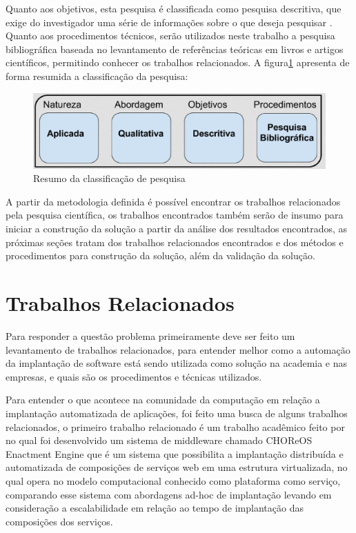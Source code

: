 Quanto aos objetivos, esta pesquisa é classificada como pesquisa descritiva, que
exige do investigador uma série de informações sobre o que deseja pesquisar
\cite{trivinos1987introduccao}. Quanto aos procedimentos técnicos, serão utilizados
neste trabalho a pesquisa bibliográfica baseada no levantamento de referências
teóricas em livros e artigos científicos, permitindo conhecer os trabalhos
relacionados. A figura\ref{fig:metodologia1} apresenta de forma resumida a
classificação da pesquisa:

\begin{figure}[h]
  \centering
  \includegraphics[width=1.0\textwidth]
      {figuras/met1.eps}
  \caption{Resumo da classificação de pesquisa}
\label{fig:metodologia1}
\end{figure}

A partir da metodologia definida é possível encontrar os trabalhos relacionados
pela pesquisa científica, os trabalhos encontrados também serão de insumo para iniciar
a construção da solução a partir da análise dos resultados encontrados,
as próximas seções tratam dos trabalhos relacionados encontrados e dos métodos e
procedimentos para construção da solução, além da validação da solução.

\section{Trabalhos Relacionados}
\label{section:trabalhos_relacionados}
Para responder a questão problema primeiramente deve ser feito um levantamento
de trabalhos relacionados, para entender melhor como a automação da implantação
de software está sendo utilizada como solução na academia e nas empresas, e
quais são os procedimentos e técnicas utilizados.

Para entender o que acontece na comunidade da computação em relação a implantação
automatizada de aplicações, foi feito uma busca de alguns trabalhos relacionados, o primeiro
trabalho relacionado é um trabalho acadêmico feito por\cite{leo2014} no qual foi
desenvolvido um sistema de middleware chamado CHOReOS Enactment Engine que é um
sistema que possibilita a implantação distribuída e automatizada de composições
de serviços web em uma estrutura virtualizada, no qual opera no modelo
computacional conhecido como plataforma como serviço, comparando esse sistema
com abordagens ad-hoc de implantação levando em consideração a escalabilidade
em relação ao tempo de implantação das composições dos serviços.

